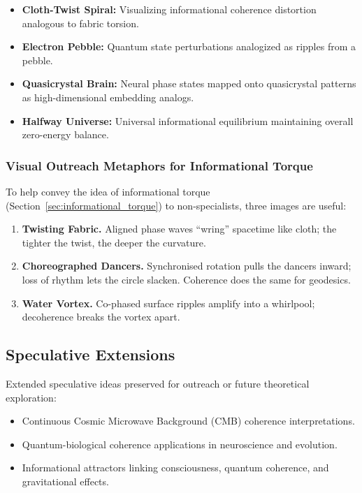 \documentclass[american,11pt,letterpaper]{article}
\begin{document}
\begin{itemize}
    \item \textbf{Cloth-Twist Spiral:} Visualizing informational coherence distortion analogous to fabric torsion.
    \item \textbf{Electron Pebble:} Quantum state perturbations analogized as ripples from a pebble.
    \item \textbf{Quasicrystal Brain:} Neural phase states mapped onto quasicrystal patterns as high-dimensional embedding analogs.
    \item \textbf{Halfway Universe:} Universal informational equilibrium maintaining overall zero-energy balance.
\end{itemize}

\subsubsection{Visual Outreach Metaphors for Informational Torque}
To help convey the idea of informational torque (Section~\ref{sec:informational_torque}) to non-specialists, three images are useful:

\begin{enumerate}[label=(\alph*)]
\item \textbf{Twisting Fabric.}  
      Aligned phase waves ``wring'' spacetime like cloth; the tighter the twist, the deeper the curvature.

\item \textbf{Choreographed Dancers.}  
      Synchronised rotation pulls the dancers inward; loss of rhythm lets the circle slacken. Coherence does the same for geodesics.

\item \textbf{Water Vortex.}  
      Co-phased surface ripples amplify into a whirlpool; decoherence breaks the vortex apart.
\end{enumerate}

\subsection{Speculative Extensions}

Extended speculative ideas preserved for outreach or future theoretical exploration:

\begin{itemize}
    \item Continuous Cosmic Microwave Background (CMB) coherence interpretations.
    \item Quantum-biological coherence applications in neuroscience and evolution.
    \item Informational attractors linking consciousness, quantum coherence, and gravitational effects.
\end{itemize}
\end{document}
